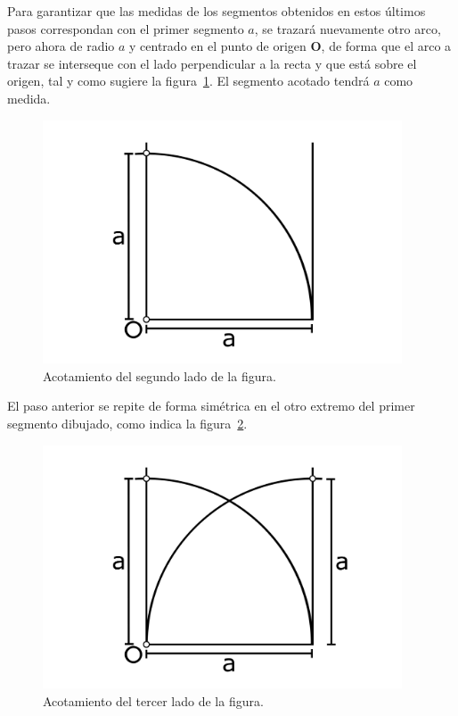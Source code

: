 Para garantizar que las medidas de los segmentos obtenidos en estos últimos pasos correspondan con el primer segmento $a$, se trazará nuevamente otro arco, pero ahora de radio $a$ y centrado en el punto de origen \textbf{O}, de forma que el arco a trazar se interseque con el lado perpendicular a la recta y que está sobre el origen, tal y como sugiere la figura~\ref{fig:TrazFig8}. El segmento acotado tendrá $a$ como medida. 

\begin{figure}[H]
\centering
\includegraphics[width=0.95\textwidth]{Figures/Cuad8}
\caption[Acotamiento del segundo lado de la figura.]{Acotamiento del segundo lado de la figura.}
\label{fig:TrazFig8}
\end{figure}

El paso anterior se repite de forma simétrica en el otro extremo del primer segmento dibujado, como indica la figura~\ref{fig:TrazFig9}.

\begin{figure}[H]
\centering
\includegraphics[width=0.95\textwidth]{Figures/Cuad9}
\caption[Acotamiento del tercer lado de la figura.]{Acotamiento del tercer lado de la figura.}
\label{fig:TrazFig9}
\end{figure}

